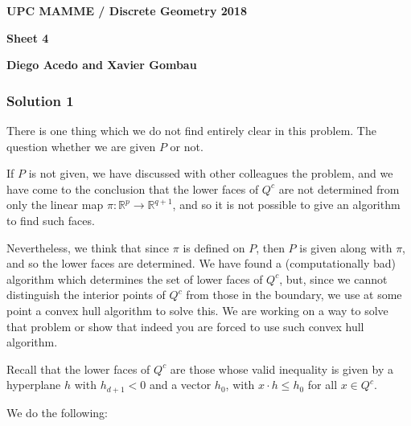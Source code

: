 \documentclass[12pt,a4paper]{article}
\newcommand{\RR}{\mathbb{R}}
\begin{document}
\noindent
\textbf{UPC MAMME / Discrete Geometry 2018}

\noindent
\textbf{Sheet 4}

\noindent
\textbf{Diego Acedo and Xavier Gombau}


\subsubsection*{Solution 1}

There is one thing which we do not find entirely clear in this problem. 
The question whether we are given $P$ or not.

If $P$ is not given, we have discussed with other colleagues the problem, and we have come to the conclusion that the lower faces of $Q^c$ are not determined from only the linear map $\pi : \RR^p \longrightarrow \RR^{q+1} $, and so it is not possible to give an algorithm to find such faces. 


Nevertheless, we think that since $\pi$ is defined on $P$, then $P$ is given along with $\pi$, and so the lower faces are determined. 
We have found a (computationally bad) algorithm which determines the set of lower faces of $Q^c$, but, since we cannot distinguish the interior points of $Q^c$ from those in the boundary, we use at some point a convex hull algorithm to solve this. 
We are working on a way to solve that problem or show that indeed you are forced to use such convex hull algorithm. 

Recall that the lower faces of $Q^c$ are those whose valid inequality is given by a hyperplane $h$ with $h_{d+1} < 0$ and a vector $h_0$, with $x \cdot h \leq h_0$ for all $x \in Q^c$.

We do the following: 
\end{document}
